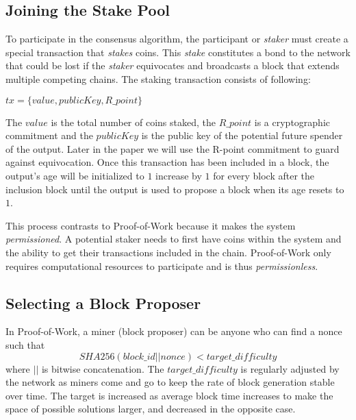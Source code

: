 \documentclass{article}
\begin{document}
\subsection{Joining the Stake Pool}

To participate in the consensus algorithm, the participant or \textit{staker} must create a special transaction that \textit{stakes} coins. This \textit{stake} constitutes a bond to the network that could be lost if the \textit{staker} equivocates and broadcasts a block that extends multiple competing chains. The staking transaction consists of following:
\begin{center}
$tx = \{value, publicKey, R\_point\}$
\end{center}
The $value$ is the total number of coins staked, the $R\_point$ is a cryptographic commitment and the $publicKey$ is the public key of the potential future spender of the output. Later in the paper we will use the R-point commitment to guard against equivocation. Once this transaction has been included in a block, the output's age will be initialized to $ 1 $ increase by $ 1 $ for every block after the inclusion block until the output is used to propose a block when its age resets to $ 1 $.

This process contrasts to Proof-of-Work because it makes the system \textit{permissioned}. A potential staker needs to first have coins within the system and the ability to get their transactions included in the chain. Proof-of-Work only requires computational resources to participate and is thus \textit{permissionless}.

\subsection{Selecting a Block Proposer}
In Proof-of-Work, a miner (block proposer) can be anyone who can find a nonce such that 
$$SHA256(block\_id || nonce) < target\_difficulty$$
where $||$ is bitwise concatenation. The $target\_difficulty$ is regularly adjusted by the network as miners come and go to keep the rate of block generation stable over time. The target is increased as average block time increases to make the space of possible solutions larger, and decreased in the opposite case.
\end{document}
